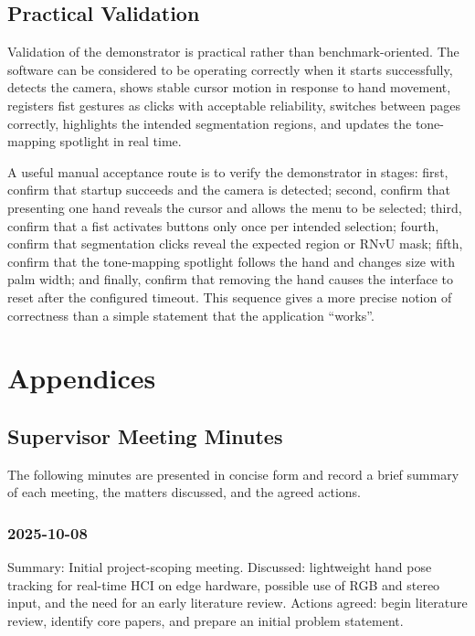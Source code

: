 ﻿\documentclass[11pt,a4paper]{article}
\begin{document}
\subsection{Practical Validation}

Validation of the demonstrator is practical rather than benchmark-oriented.
The software can be considered to be operating correctly when it starts
successfully, detects the camera, shows stable cursor motion in response to
hand movement, registers fist gestures as clicks with acceptable reliability,
switches between pages correctly, highlights the intended segmentation
regions, and updates the tone-mapping spotlight in real time.

\medskip

A useful manual acceptance route is to verify the demonstrator in stages:
first, confirm that startup succeeds and the camera is detected; second,
confirm that presenting one hand reveals the cursor and allows the menu to be
selected; third, confirm that a fist activates buttons only once per intended
selection; fourth, confirm that segmentation clicks reveal the expected region
or RNvU mask; fifth, confirm that the tone-mapping spotlight follows the hand
and changes size with palm width; and finally, confirm that removing the hand
causes the interface to reset after the configured timeout. This sequence gives
a more precise notion of correctness than a simple statement that the
application ``works''.

\medskip

\appendix

\section{Appendices}

\subsection{Supervisor Meeting Minutes}

The following minutes are presented in concise form and record a brief summary
of each meeting, the matters discussed, and the agreed actions.

\subsubsection*{2025-10-08}

Summary: Initial project-scoping meeting.
Discussed: lightweight hand pose tracking for real-time HCI on edge hardware,
possible use of RGB and stereo input, and the need for an early literature
review.
Actions agreed: begin literature review, identify core papers, and prepare an
initial problem statement.
\end{document}
